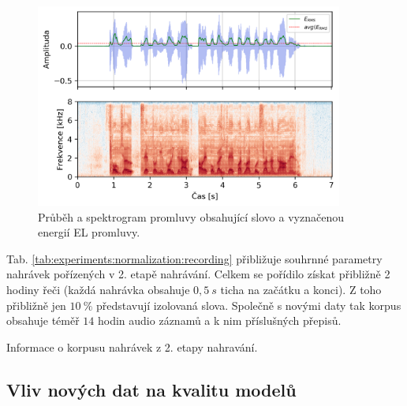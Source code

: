 \begin{figure}[hbpt]
  \centering
  \includegraphics[width=0.9\textwidth]{./ch5-construction/img/energy_spec_sentence.png}
  \caption{Průběh a spektrogram promluvy obsahující slovo  a vyznačenou energií EL promluvy.}
  \label{fig:experiments:normalization:sentence}
\end{figure}

Tab. \ref{tab:experiments:normalization:recording} přibližuje souhrnné parametry nahrávek pořízených v 2. etapě nahrávání. Celkem se pořídilo získat přibližně 2 hodiny řeči (každá nahrávka obsahuje $0,5\ s$ ticha na začátku a konci). Z toho přibližně jen $10\ \%$ představují izolovaná slova. Společně s novými daty tak korpus obsahuje téměř $14$ hodin audio záznamů a k nim příslušných přepisů.

\begin{table}[htpb]
  \centering
  \def\arraystretch{1.5}
  \caption{Informace o korpusu nahrávek z 2. etapy nahravání.}
  \label{tab:experiments:normalization:recording}
\end{table}

\subsection{Vliv nových dat na kvalitu modelů}
\label{chap:realisation:test:quality}

